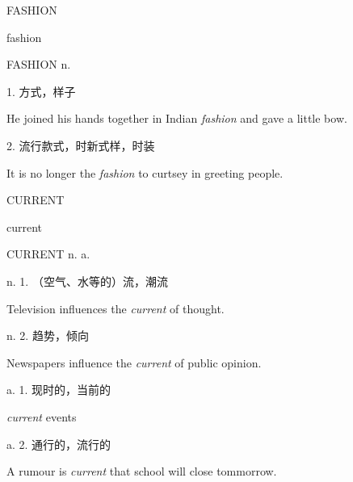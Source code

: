 \begin{flashcard}{
FASHION

fashion
}
\begin{center}
FASHION n. 
\end{center}
1. 方式，样子

He joined his hands together in Indian \textit{fashion} and gave a little bow.

2. 流行款式，时新式样，时装

It is no longer the \textit{fashion} to curtsey in greeting people.

\end{flashcard}
\begin{flashcard}{
CURRENT

current
}
\begin{center}
CURRENT n. a. 
\end{center}
n. 1. （空气、水等的）流，潮流

Television influences the \textit{current} of thought.

n. 2. 趋势，倾向

Newspapers influence the \textit{current} of public opinion.

a. 1. 现时的，当前的

\textit{current} events

a. 2. 通行的，流行的

A rumour is \textit{current} that school will close tommorrow.

\end{flashcard}
